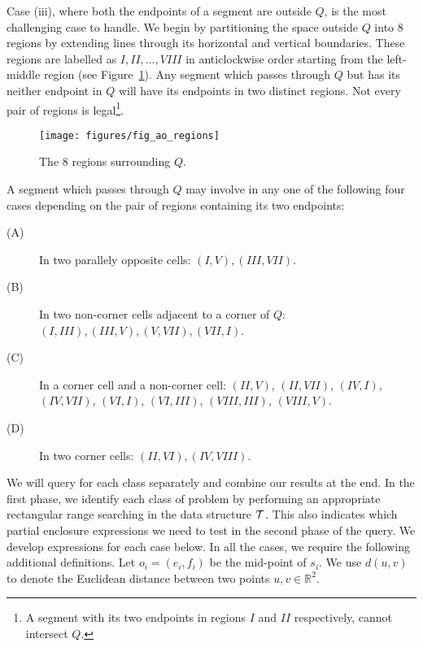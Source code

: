 Case (iii), where both the endpoints of a segment are outside $Q$, 
is the most challenging case to handle. We begin by partitioning the 
space outside $Q$ into 8 regions by extending lines through its 
horizontal and vertical boundaries. These regions are labelled as 
$I, II, \ldots, VIII$ in anticlockwise order starting from the 
left-middle region (see Figure~\ref{fig:rectangles:ao:regions}). Any 
segment which passes through $Q$ but has its neither endpoint in $Q$ 
will have its endpoints in two distinct regions. Not every pair of 
regions is legal\footnote{A segment with its two endpoints 
in regions $I$ and $II$ respectively, cannot intersect $Q$.}.

\begin{figure}[t]
\begin{center}
  \texttt{[image: figures/fig\_ao\_regions]}
  \caption{The 8 regions surrounding $Q$.}
  \label{fig:rectangles:ao:regions}
\end{center}
\end{figure}

A segment which passes through $Q$ may involve in any one of the following 
four cases depending on the pair of regions containing its two endpoints:

\begin{description}
\item[(A)] In two parallely opposite cells: $(I, V), (III, VII)$.
\item[(B)] In two non-corner cells adjacent to a corner of $Q$: $(I, III), (III, V), (V,VII), (VII, I)$.
\item[(C)] In a corner cell and a non-corner cell: $(II, V)$, $(II, VII)$, $(IV, I)$, 
$(IV, VII)$, $(VI, I)$, \newline $(VI, III)$, $(VIII, III)$, $(VIII, V)$.
\item[(D)] In two corner cells: $(II, VI), (IV, VIII)$.
\end{description}

We will query for each class separately and combine our results at the end. 
In the first phase, we identify each class of problem 
by performing an appropriate rectangular range searching in the 
data structure $\cal T$. 
This also indicates which partial enclosure expressions we need to test in 
the second phase of the query. We develop expressions for each case below. 
In all the cases, we require the following additional definitions. Let 
$o_i = (e_i, f_i)$ be the mid-point of $s_i$. We use  
$d(u,v)$ to denote the Euclidean distance between two points $u,v \in 
\mathbb{R}^2$. 

